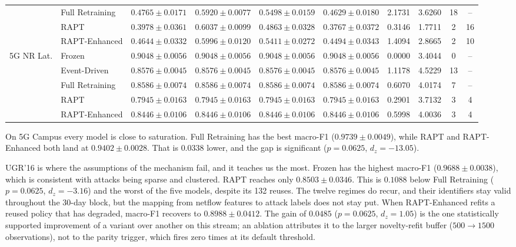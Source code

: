 \documentclass[conference]{IEEEtran}
\begin{document}
\begin{table}[t]
\begin{tabular}{@{}llcccccccc@{}}
 & Full Retraining & $\mathbf{0.4765 \pm 0.0171}$ & $0.5920 \pm 0.0077$ & $0.5498 \pm 0.0159$ & $0.4629 \pm 0.0180$ & 2.1731 & 3.6260 & 18 & -- \\
 & RAPT & $0.3978 \pm 0.0361$ & $0.6037 \pm 0.0099$ & $0.4863 \pm 0.0328$ & $0.3767 \pm 0.0372$ & 0.3146 & 1.7711 & 2 & 16 \\
 & RAPT-Enhanced & $0.4644 \pm 0.0332$ & $0.5996 \pm 0.0120$ & $0.5411 \pm 0.0272$ & $0.4494 \pm 0.0343$ & 1.4094 & 2.8665 & 2 & 10 \\
\midrule
\multirow{5}{*}{5G NR Lat.}
 & Frozen & $\mathbf{0.9048 \pm 0.0056}$ & $0.9048 \pm 0.0056$ & $0.9048 \pm 0.0056$ & $0.9048 \pm 0.0056$ & 0.0000 & 3.4044 & 0 & -- \\
 & Event-Driven & $0.8576 \pm 0.0045$ & $0.8576 \pm 0.0045$ & $0.8576 \pm 0.0045$ & $0.8576 \pm 0.0045$ & 1.1178 & 4.5229 & 13 & -- \\
 & Full Retraining & $0.8586 \pm 0.0074$ & $0.8586 \pm 0.0074$ & $0.8586 \pm 0.0074$ & $0.8586 \pm 0.0074$ & 0.6070 & 4.0174 & 7 & -- \\
 & RAPT & $0.7945 \pm 0.0163$ & $0.7945 \pm 0.0163$ & $0.7945 \pm 0.0163$ & $0.7945 \pm 0.0163$ & 0.2901 & 3.7132 & 3 & 4 \\
 & RAPT-Enhanced & $0.8446 \pm 0.0106$ & $0.8446 \pm 0.0106$ & $0.8446 \pm 0.0106$ & $0.8446 \pm 0.0106$ & 0.5998 & 4.0036 & 3 & 4 \\
\bottomrule
\end{tabular}
\end{table}


On 5G Campus every model is close to saturation. Full Retraining has the best macro-F1
($0.9739 \pm 0.0049$), while RAPT and RAPT-Enhanced both land at $0.9402 \pm 0.0028$.
That is $0.0338$ lower, and the gap is significant ($p = 0.0625$,
$d_z = -13.05$). 


UGR'16 is where the assumptions of the mechanism fail, and it teaches us the most. Frozen
has the highest macro-F1 ($0.9688 \pm 0.0038$), which is consistent with attacks being
sparse and clustered. RAPT reaches only $0.8503 \pm 0.0346$. This is $0.1088$ below Full
Retraining ($p = 0.0625$, $d_z = -3.16$) and the worst of the five models,
despite its 132 reuses. The twelve regimes do recur, and their identifiers stay valid
throughout the 30-day block, but the mapping from netflow features to attack labels does
not stay put.  When RAPT-Enhanced refits a reused
policy that has degraded, macro-F1 recovers to $0.8988 \pm 0.0412$. The gain of $0.0485$
($p = 0.0625$, $d_z = 1.05$) is the one statistically supported improvement of
a variant over another on this stream; an ablation attributes it to the larger
novelty-refit buffer ($500 \to 1500$ observations), not to the parity trigger, which
fires zero times at its default threshold.
\end{document}
